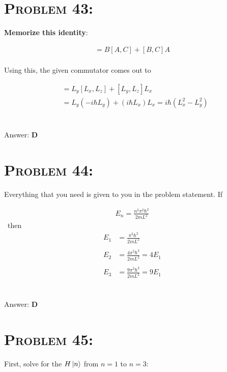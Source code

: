 \documentclass{article}
\begin{document}

\section{\textsc{Problem 43:}} \textbf{Memorize this identity}:

\begin{gather}
[AB, C] = B [A, C] + [B, C] A
\end{gather}
\\
Using this, the given commutator comes out to

\begin{align}
[L_{x}L_{y}, L_{z}] &= L_{y} [L_{x}, L_{z}] + [L_{y}, L_{z}] L_{x}\nonumber\\
&= L_{y} (-i \hbar L_{y}) + (i \hbar L_{x})L_{x} = i \hbar ( L_{x}^{2} -  L_{y}^{2} )\nonumber
\end{align}
\\\\
Answer: \textbf{\textcolor{ProcessBlue}D}\\


\section{\textsc{Problem 44:}} Everything that you need is given to you in the problem statement. If

\begin{gather}
E_n = \frac{n^{2} \pi^{2} \hbar^{2}}{2mL^{2}}
\end{gather}
\
then
\begin{align}
E_1 &= \frac{\pi^{2} \hbar^{2}}{2mL^{2}}\nonumber\\
\nonumber\\
E_2 &= \frac{4 \pi^{2} \hbar^{2}}{2mL^{2}} = 4E_{1}\nonumber\\
\nonumber\\
E_3 &= \frac{9 \pi^{2} \hbar^{2}}{2mL^{2}} = \boxed{9E_{1}}\nonumber
\end{align}
\\\\
Answer: \textbf{\textcolor{ProcessBlue}D}\\


\section{\textsc{Problem 45:}} First, solve for the $H \ket{n}$ from $n = 1$ to $n = 3$:
\end{document}

